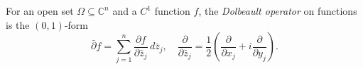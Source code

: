 
For an open set $\Omega\subseteq\mathbb C^n$ and a $C^1$ function $f$, the \emph{Dolbeault operator} on functions is the $(0,1)$-form
\[
\bar\partial f=\sum_{j=1}^n\frac{\partial f}{\partial\bar z_j}\,d\bar z_j,
\quad\frac{\partial}{\partial\bar z_j}=\frac12\left(\frac{\partial}{\partial x_j}+i\frac{\partial}{\partial y_j}\right).
\]
